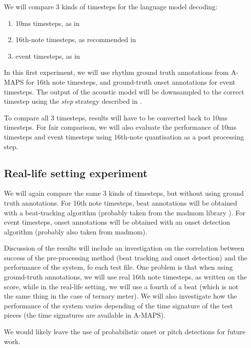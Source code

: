 \documentclass{article}
\begin{document}
We will compare 3 kinds of timesteps for the language model decoding:

\begin{enumerate}
\item 10ms timesteps, as in \citep{sigtia2016end}
\item 16th-note timesteps, as recommended in \citep{Ycart2017}
\item event timesteps, as in \citep{app8030470}
\end{enumerate}

In this first experiment, we will use rhythm ground truth annotations from A-MAPS for 16th note timesteps, and ground-truth onset annotations for event timesteps.
The output of the acoustic model will be downsampled to the correct timestep using the \emph{step}
strategy described in \citep{ycart2018polyphonic}.

To compare all 3 timesteps, results will have to be converted back to 10ms timesteps.
For fair comparison, we will also evaluate the performance of 10ms timesteps and event timesteps using 16th-note quantisation as a post processing step.

\subsection{Real-life setting experiment}

We will again compare the same 3 kinds of timesteps, but without using ground truth annotations.
For 16th note timesteps, beat annotations will be obtained with a beat-tracking algorithm (probably taken from the madmom library \citep{madmom}).
For event timesteps, onset annotations will be obtained with an onset detection algorithm (probably also taken from madmom).

Discussion of the results will include an investigation on the correlation between success of the pre-processing method (beat tracking and onset detection) and the performance of the system, fo each test file.
One problem is that when using ground-truth annotations, we will use real 16th note timesteps, as written on the score, while in the real-life setting, we will use a fourth of a beat (which is not the same thing in the case of ternary meter).
We will also investigate how the performance of the system varies depending of the time signature of the test pieces (the time signatures are available in A-MAPS).

We would likely leave the use of probabilistic onset or pitch detections for future work.
\end{document}

